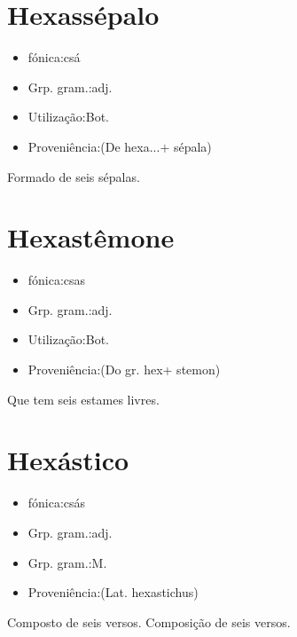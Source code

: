 \documentclass{article}
\begin{document}
\section{Hexassépalo}
\begin{itemize}
\item {fónica:csá}
\end{itemize}
\begin{itemize}
\item {Grp. gram.:adj.}
\end{itemize}
\begin{itemize}
\item {Utilização:Bot.}
\end{itemize}
\begin{itemize}
\item {Proveniência:(De \textunderscore hexa...\textunderscore  + \textunderscore sépala\textunderscore )}
\end{itemize}
Formado de seis sépalas.
\section{Hexastêmone}
\begin{itemize}
\item {fónica:csas}
\end{itemize}
\begin{itemize}
\item {Grp. gram.:adj.}
\end{itemize}
\begin{itemize}
\item {Utilização:Bot.}
\end{itemize}
\begin{itemize}
\item {Proveniência:(Do gr. \textunderscore hex\textunderscore  + \textunderscore stemon\textunderscore )}
\end{itemize}
Que tem seis estames livres.
\section{Hexástico}
\begin{itemize}
\item {fónica:csás}
\end{itemize}
\begin{itemize}
\item {Grp. gram.:adj.}
\end{itemize}
\begin{itemize}
\item {Grp. gram.:M.}
\end{itemize}
\begin{itemize}
\item {Proveniência:(Lat. \textunderscore hexastichus\textunderscore )}
\end{itemize}
Composto de seis versos.
Composição de seis versos.
\end{document}
